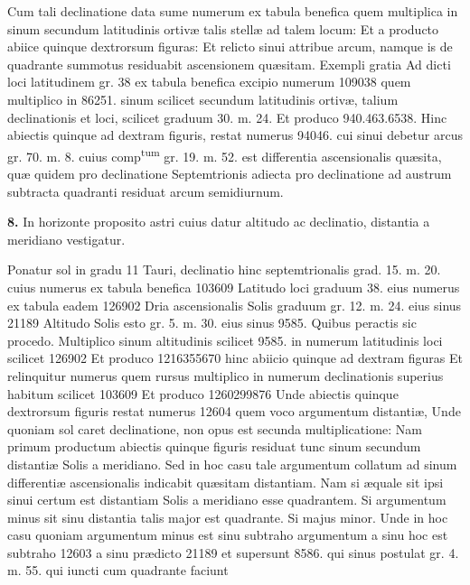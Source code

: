 \documentclass[11pt,a4paper]{article}
\begin{document}
Cum tali declinatione data sume numerum ex tabula benefica
quem multiplica in sinum secundum latitudinis ortivæ talis
stellæ ad talem locum: Et a producto abiice quinque dextrorsum
figuras: Et relicto sinui attribue arcum, namque is de quadrante
summotus residuabit ascensionem quæsitam. Exempli gratia
Ad dicti loci latitudinem gr. 38 ex tabula benefica excipio
numerum 109038 quem multiplico in 86251. sinum scilicet
secundum latitudinis ortivæ, talium declinationis et loci,
scilicet graduum 30. m. 24. Et produco 940.463.6538.
Hinc abiectis quinque ad dextram figuris, restat numerus
94046. cui sinui debetur arcus gr. 70. m. 8. cuius comp\textsuperscript{tum}
gr. 19. m. 52. est differentia ascensionalis quæsita, quæ
quidem pro declinatione Septemtrionis adiecta pro declinatione
ad austrum subtracta quadranti residuat arcum semidiurnum.

\textbf{8.} In horizonte proposito astri cuius datur altitudo ac
declinatio, distantia a meridiano vestigatur.

Ponatur sol in gradu 11 Tauri, declinatio hinc septemtrionalis
grad. 15. m. 20. cuius numerus ex tabula benefica 103609
Latitudo loci graduum 38. eius numerus ex tabula eadem
126902 Dria ascensionalis Solis graduum gr. 12. m. 24.
eius sinus 21189 Altitudo Solis esto gr. 5. m. 30. eius sinus
9585. Quibus peractis sic procedo. Multiplico sinum altitudinis
scilicet 9585. in numerum latitudinis loci scilicet 126902
Et produco 1216355670 hinc abiicio quinque ad dextram figuras
Et relinquitur numerus  quem rursus multiplico in
numerum declinationis superius habitum scilicet 103609 Et
produco 1260299876 Unde abiectis quinque dextrorsum
figuris restat numerus 12604 quem voco argumentum distantiæ,
Unde quoniam sol caret declinatione, non opus est secunda
multiplicatione: Nam primum productum abiectis quinque
figuris residuat tunc sinum secundum distantiæ Solis a meridiano.
Sed in hoc casu tale argumentum collatum ad sinum differentiæ
ascensionalis indicabit quæsitam distantiam. Nam si æquale
sit ipsi sinui certum est distantiam Solis a meridiano esse
quadrantem. Si argumentum minus sit sinu distantia talis
major est quadrante. Si majus minor. Unde in hoc casu quoniam
argumentum minus est sinu subtraho argumentum a sinu
hoc est subtraho 12603 a sinu prædicto 21189 et supersunt 8586.
qui sinus postulat gr. 4. m. 55. qui iuncti cum quadrante faciunt
\end{document}

